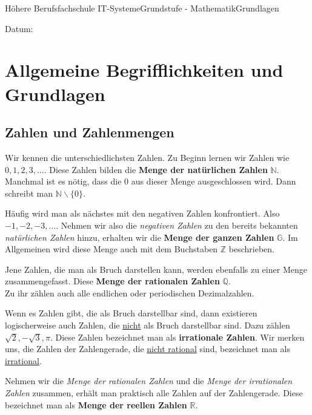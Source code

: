 \documentclass[11pt,twocolumn,oneside,openany,headings=optiontotoc,11pt,numbers=noenddot]{article}
\begin{document}
	\begin{worksheet}{Höhere Berufsfachschule IT-Systeme}{Grundstufe - Mathematik}{Grundlagen}
		\begin{framed}
			Datum:
		\end{framed}
		\section{Allgemeine Begrifflichkeiten und Grundlagen}
		\subsection{Zahlen und Zahlenmengen}
		Wir kennen die unterschiedlichsten Zahlen. Zu Beginn lernen wir Zahlen wie  \(0,1,2,3,\ldots\). Diese Zahlen bilden die \textbf{Menge der natürlichen Zahlen} \(\mathbb{N}\). Manchmal ist es nötig, dass die \(0\) aus dieser Menge ausgeschlossen wird. Dann schreibt man \(\mathbb{N}\backslash\{0\}\).\\
		\par\noindent
		Häufig wird man als nächstes mit den negativen Zahlen konfrontiert. Also \(-1,-2,-3,\ldots\). Nehmen wir also die \textit{negativen Zahlen} zu den bereits bekannten \textit{natürlichen Zahlen} hinzu, erhalten wir die \textbf{Menge der ganzen Zahlen} \(\mathbb{G}\). Im Allgemeinen wird diese Menge auch mit dem Buchstaben \(\mathbb{Z}\) beschrieben.\\
		\par\noindent
		Jene Zahlen, die man als Bruch darstellen kann, werden ebenfalls zu einer Menge zusammengefasst. Diese \textbf{Menge der rationalen Zahlen} \(\mathbb{Q}\).\\
		Zu ihr zählen auch alle endlichen oder periodischen Dezimalzahlen.\\
		\par\noindent
		Wenn es Zahlen gibt, die als Bruch darstellbar sind, dann existieren logischerweise auch Zahlen, die \underline{nicht} als Bruch darstellbar sind. Dazu zählen \(\sqrt{2}, -\sqrt{3}, \pi \). Diese Zahlen bezeichnet man als \textbf{irrationale Zahlen}. Wir merken uns, die Zahlen der Zahlengerade, die \underline{nicht rational} sind, bezeichnet man als \underline{irrational}.\\
		\par\noindent
		Nehmen wir die \textit{Menge der rationalen Zahlen} und die \textit{Menge der irrationalen Zahlen} zusammen, erhält man praktisch alle Zahlen auf der Zahlengerade. Diese bezeichnet man als \textbf{Menge der reellen Zahlen} \(\mathbb{R}\).\\

\end{worksheet}
\end{document}
